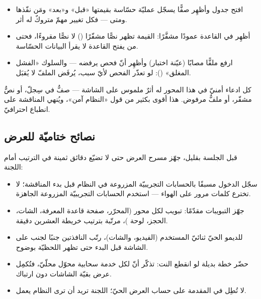 \begin{idea}
\begin{itemize}
\item افتح جدول  وأظهِر صفًّا يسجّل عمليّة حسّاسة بقيمتها «قبل» و«بعد»
  ومَن نفّذها ومتى — فكل تغيير مهمّ متروكٌ له أثر.
\item أظهِر في القاعدة عمودًا مشفَّرًا: القيمة تظهر نصًّا مشفّرًا ()
  لا نصًّا مقروءًا، فحتى من يفتح القاعدة لا يقرأ البيانات الحسّاسة.
\item ارفع ملفًّا مصابًا (عيّنة اختبار) وأظهِر أنّ فحص  يرفضه — والسلوك
  «الفشل المغلق» (): لو تعذّر الفحص لأيّ سبب، يُرفَض الملفّ لا يُقبَل.
\end{itemize}
\end{idea}

\begin{keyp}
كل ادعاء أمنيّ في هذا المحور له أثرٌ ملموس على الشاشة — صفٌّ في سِجلّ، أو نصٌّ
مشفّر، أو ملفٌّ مرفوض. هذا أقوى بكثير من قول «النظام آمن»، ويُنهي المناقشة على انطباع
احترافيّ.
\end{keyp}

\subsection{نصائح ختاميّة للعرض}

قبل الجلسة بقليل، جهّز مسرح العرض حتى لا تضيّع دقائق ثمينة في الترتيب أمام اللجنة:

\begin{itemize}
\item سجّل الدخول مسبقًا بالحسابات التجريبيّة المزروعة في النظام قبل بدء المناقشة؛
  لا تخترع كلمات مرور على الهواء — استخدم الحسابات التجريبيّة المزروعة الجاهزة.
\item جهّز التبويبات مقدّمًا: تبويب لكل محور (المحرّر، صفحة قاعدة المعرفة، الشات،
  الحجز، لوحة )، مرتّبة بترتيب خريطة العشرين دقيقة.
\item للديمو الحيّ ثنائيّ المستخدم (الفيديو، والشات)، رتّب النافذتين جنبًا لجنب على
  الشاشة قبل البدء حتى تظهر اللحظيّة بوضوح.
\item حضّر خطة بديلة لو انقطع النت: تذكّر أنّ لكل خدمة سحابية محوّل  محلّيّ،
  فتُكمِل عرض بقيّة الشاشات  دون ارتباك.
\item لا تُطِل في المقدمة على حساب العرض الحيّ؛ اللجنة تريد أن ترى النظام يعمل.
\end{itemize}

